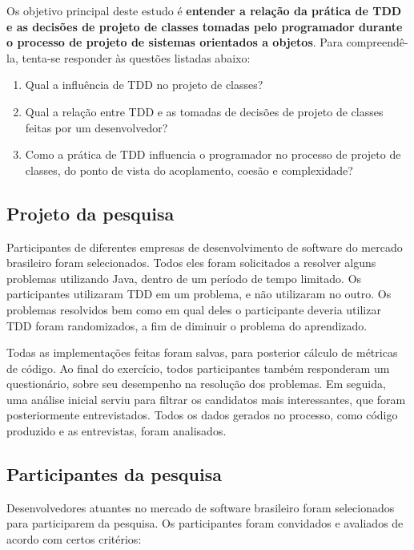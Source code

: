 \documentclass[conference]{IEEEtran}
\begin{document}
Os objetivo principal deste estudo é \textbf{entender a relação da prática de TDD 
e as decisões de projeto de classes tomadas pelo programador durante o processo de 
projeto de sistemas orientados a objetos}.
Para compreendê-la, tenta-se responder às questões listadas
abaixo:

\begin{enumerate}

	\item Qual a influência de TDD no projeto de classes?

	\item Qual a relação entre TDD e as tomadas de decisões de projeto de classes
	feitas por um desenvolvedor?

	\item Como a prática de TDD influencia o programador no processo de  
	projeto de classes, do ponto de vista do acoplamento, coesão e complexidade?

\end{enumerate}

\subsection{Projeto da pesquisa}

Participantes de diferentes empresas de desenvolvimento de software do mercado
brasileiro foram selecionados. Todos eles foram solicitados a resolver 
alguns problemas utilizando Java, dentro de um período de tempo limitado. 
Os participantes utilizaram TDD em um problema, e não utilizaram
no outro. Os problemas resolvidos bem como em qual deles o participante
deveria utilizar TDD foram randomizados, a fim de diminuir o problema do aprendizado.

Todas as implementações feitas foram salvas, para posterior
cálculo de métricas de código. Ao final do exercício, todos participantes
também responderam um questionário, sobre seu desempenho na resolução dos problemas.
Em seguida, uma análise inicial serviu para filtrar os candidatos
mais interessantes, que foram posteriormente entrevistados. 
Todos os dados gerados no processo, 
como código produzido e as entrevistas, foram analisados.


\subsection{Participantes da pesquisa}
\label{sec:planejamento-participantes}

Desenvolvedores atuantes no mercado de 
software brasileiro foram selecionados para participarem da pesquisa.
Os participantes foram convidados e avaliados de acordo com certos critérios:
\end{document}
